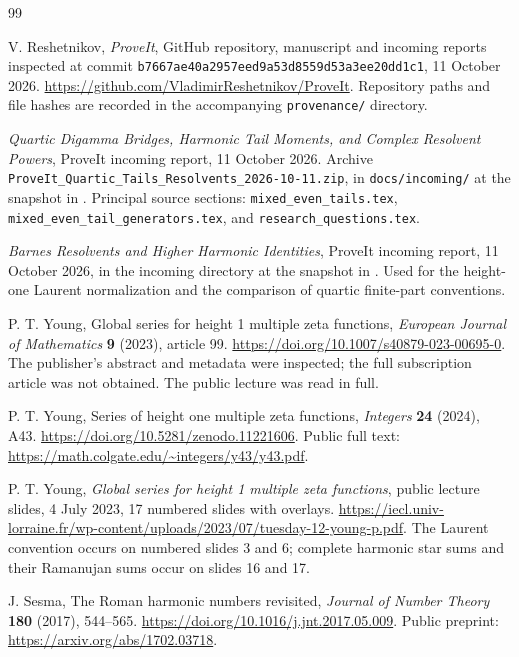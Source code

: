 \begin{thebibliography}{99}
\raggedright

V. Reshetnikov, \emph{ProveIt}, GitHub repository, manuscript and
incoming reports inspected at commit
\texttt{b7667ae40a2957eed9a53d8559d53a3ee20dd1c1},
11 October 2026.
\url{https://github.com/VladimirReshetnikov/ProveIt}.
Repository paths and file hashes are recorded in the accompanying
\texttt{provenance/} directory.

\emph{Quartic Digamma Bridges, Harmonic Tail Moments, and Complex Resolvent Powers}, ProveIt incoming report,
11 October 2026. Archive
\texttt{ProveIt\_Quartic\_Tails\_Resolvents\_2026-10-11.zip},
in \texttt{docs/incoming/} at the snapshot in \cite{Repo}.
Principal source sections: \texttt{mixed\_even\_tails.tex},
\texttt{mixed\_even\_tail\_generators.tex}, and
\texttt{research\_questions.tex}.

\emph{Barnes Resolvents and Higher Harmonic Identities}, ProveIt incoming
report, 11 October 2026, in the incoming directory at the snapshot
in \cite{Repo}. Used for the height-one Laurent normalization and
the comparison of quartic finite-part conventions.

P. T. Young, Global series for height 1 multiple zeta functions,
\emph{European Journal of Mathematics} \textbf{9} (2023), article 99.
\url{https://doi.org/10.1007/s40879-023-00695-0}.
The publisher's abstract and metadata were inspected; the full
subscription article was not obtained. The public lecture
\cite{YoungLecture} was read in full.

P. T. Young, Series of height one multiple zeta functions,
\emph{Integers} \textbf{24} (2024), A43.
\url{https://doi.org/10.5281/zenodo.11221606}.
Public full text: \url{https://math.colgate.edu/~integers/y43/y43.pdf}.

P. T. Young, \emph{Global series for height 1 multiple zeta functions},
public lecture slides, 4 July 2023, 17 numbered slides with overlays.
\url{https://iecl.univ-lorraine.fr/wp-content/uploads/2023/07/tuesday-12-young-p.pdf}.
The Laurent convention occurs on numbered slides 3 and 6; complete
harmonic star sums and their Ramanujan sums occur on slides 16 and 17.

J. Sesma, The Roman harmonic numbers revisited,
\emph{Journal of Number Theory} \textbf{180} (2017), 544--565.
\url{https://doi.org/10.1016/j.jnt.2017.05.009}.
Public preprint: \url{https://arxiv.org/abs/1702.03718}.


\end{thebibliography}
